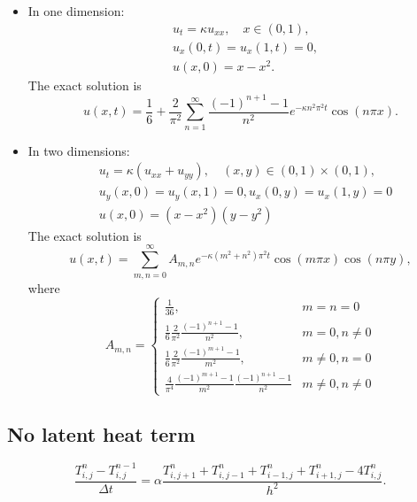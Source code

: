 \documentclass[a4paper,12pt]{article}
\begin{document}
\begin{itemize}
\item In one dimension:
\begin{align*}
& u_t = \kappa u_{xx}, \quad x \in (0,1), \\
& u_x(0,t) = u_x(1,t) = 0, \\
& u(x,0) = x - x^2.
\end{align*}
The exact solution is 
\begin{equation}
u(x,t) = \frac{1}{6} + \frac{2}{\pi^2} \sum_{n=1}^{\infty} \frac{(-1)^{n+1} - 1}{n^2}  e^{ -\kappa n^2 \pi^2 t } \cos( n \pi x ).
\end{equation}

\item In two dimensions:
\begin{align*}
& u_t = \kappa ( u_{xx} + u_{yy} ), \quad (x,y) \in (0,1) \times (0,1), \\
& u_y(x,0) = u_y(x,1) = 0, u_x(0,y) = u_x(1,y) = 0 \\
& u(x,0) =(x - x^2) (y-y^2)
\end{align*}
The exact solution is
\begin{equation}
u(x,t) = \sum_{m,n=0}^{\infty} A_{m,n}  e^{ -\kappa (m^2+n^2) \pi^2 t } \cos( m \pi x ) \cos(n \pi y ), 
\end{equation}
where
\begin{equation}
A_{m,n} = \left \{
\begin{array}{ll}
\frac{1}{36}, & m=n=0 \\
\frac{1}{6} \frac{2}{\pi^2}\frac{(-1)^{n+1} - 1}{n^2},  & m = 0, n \neq 0 \\
\frac{1}{6} \frac{2}{\pi^2}\frac{(-1)^{m+1} - 1}{m^2},  & m \neq 0, n = 0 \\
\frac{4}{\pi^4}\frac{(-1)^{m+1} - 1}{m^2}  \frac{(-1)^{n+1} - 1}{n^2} & m \neq 0, n \neq 0
\end{array}
\right.
\end{equation}





\end{itemize}


\subsection{No latent heat term}

\begin{equation}
\frac{T_{i,j}^n - T_{i,j}^{n-1}}{\Delta t} = \alpha \frac{T_{i,j+1}^n + T_{i,j-1}^n + T_{i-1,j}^n + T_{i+1,j}^n - 4 T_{i,j}^n }{h^2}.
\end{equation}
\end{document}
